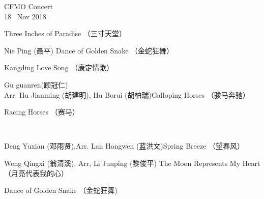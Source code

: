 \documentclass[letter,6pt,poets]{ConcProg}
\begin{document}
\begin{programme}{
    CFMO Concert
\\  {\normalsize 18 ~Nov 2018}
}
\begin{part}[]
\begin{composition}{}{}{Three Inches of Paradise  （三寸天堂）}{}
    \end{composition}
    \begin{composition}{Nie Ping (聂平)} {}{Dance of Golden Snake  （金蛇狂舞）}{}
    \end{composition}
    \begin{composition}{}{}{Kangding Love Song  （康定情歌）}{}
    \end{composition}
    \begin{composition}{Gu guanren(顾冠仁)\\ Arr. Hu Jianming (胡建明), Hu Borui (胡柏瑞)}{}{Galloping Horses  （骏马奔驰）}{}
    \end{composition}
    \begin{composition}{}{}{Racing Horses  （赛马）}{}
    \end{composition}\\
    \begin{composition}{Deng Yuxian (邓雨贤),Arr. Lan Hongwen (蓝洪文)}{}{Spring Breeze  （望春风）}{}
    \end{composition}
    \begin{composition}{Weng Qingxi (翁清溪), Arr, Li Junping (黎俊平) }{}{The Moon Represents My Heart  （月亮代表我的心）}{}
                   {}{}
    \end{composition}
    \begin{composition}{}{}{Dance of Golden Snake  （金蛇狂舞)}{}
                   {}{}
    \end{composition}
    
    



\end{part}
\end{programme}
\end{document}
